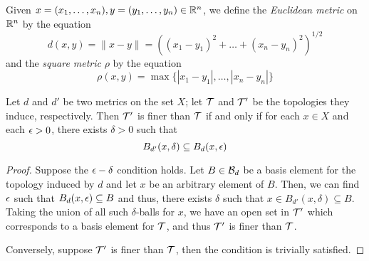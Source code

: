 \begin{definition}
    Given $x = (x_1,\ldots,x_n), y = (y_1,\ldots,y_n)\in\mathbb{R}^n$, we define the \textit{Euclidean metric} on $\mathbb{R}^n$ by the equation 
    \begin{equation*}
        d(x,y) = \|x - y\| = \left((x_1 - y_1)^2 + \ldots + (x_n - y_n)^2\right)^{1/2}
    \end{equation*}
    and the \textit{square metric} $\rho$ by the equation 
    \begin{equation*}
        \rho(x,y) = \max\{|x_1 - y_1|,\ldots,|x_n - y_n|\}
    \end{equation*}
\end{definition}

\begin{lemma}
    Let $d$ and $d'$ be two metrics on the set $X$; let $\mathcal{T}$ and $\mathcal{T}'$ be the topologies they induce, respectively. Then $\mathcal{T}'$ is finer than $\mathcal{T}$ if and only if for each $x\in X$ and each $\epsilon > 0$, there exists $\delta > 0$ such that 
    \begin{equation}
        B_{d'}(x,\delta)\subseteq B_d(x,\epsilon)
    \end{equation}
\end{lemma}
\begin{proof}
    Suppose the $\epsilon-\delta$ condition holds. Let $B\in\mathcal{B}_d$ be a basis element for the topology induced by $d$ and let $x$ be an arbitrary element of $B$. Then, we can find $\epsilon$ such that $B_d(x,\epsilon)\subseteq B$ and thus, there exists $\delta$ such that $x\in B_{d'}(x,\delta)\subseteq B$. Taking the union of all such $\delta$-balls for $x$, we have an open set in $\mathcal{T}'$ which corresponds to a basis element for $\mathcal{T}$, and thus $\mathcal{T}'$ is finer than $\mathcal{T}$. 

    Conversely, suppose $\mathcal{T}'$ is finer than $\mathcal{T}$, then the condition is trivially satisfied.
\end{proof}

